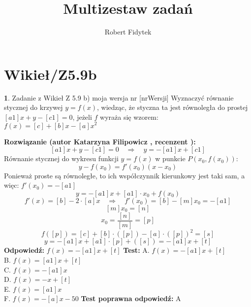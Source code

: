 \documentclass[12pt, a4paper]{article}
\title{Multizestaw zadań}
\author{Robert Fidytek}
\date{}
\theoremstyle{definition} %
\newtheorem{zad}{}
\newcommand{\kategoria}[1]{\section{#1}} %
\newcommand{\zadStart}[1]{\begin{zad}#1\newline} %
\newcommand{\zadStop}{\end{zad}}   %
\newcommand{\rozwStart}[2]{\noindent \textbf{Rozwiązanie (autor #1 , recenzent #2): }\newline} %
\newcommand{\rozwStop}{\newline}                                            %
\newcommand{\odpStart}{\noindent \textbf{Odpowiedź:}\newline}    %
\newcommand{\odpStop}{\newline}                                             %
\newcommand{\testStart}{\noindent \textbf{Test:}\newline} %
\newcommand{\testStop}{\newline} %
\newcommand{\kluczStart}{\noindent \textbf{Test poprawna odpowiedź:}\newline} %
\newcommand{\kluczStop}{\newline} %
\begin{document}
\maketitle


\kategoria{Wikieł/Z5.9b}
\zadStart{Zadanie z Wikieł Z 5.9 b) moja wersja nr [nrWersji]}
Wyznaczyć równanie stycznej do krzywej $y=f(x)$, wiedząc, że styczna ta jest równoległa do prostej $[a1]x+y-[c1]=0$, jeżeli $f$ wyraża się wzorem:\\
$f(x)=[c] +[b]x-[a]x^2$
\zadStop
\rozwStart{Katarzyna Filipowicz}{}
$$
[a1]x+y-[c1]=0 \quad \Rightarrow \quad y=-[a1]x+[c1]
$$
Równanie stycznej do wykresu funkcji $y=f(x)$ w punkcie $P(x_0,f(x_0))$:
$$
y-f(x_0)=f'(x_0)(x-x_0)
$$
Ponieważ proste są równoległe, to ich współczynnik kierunkowy jest taki sam, a więc: $f'(x_0)=-[a1]$
$$
y=-[a1]x+[a1]\cdot x_0+f(x_0)
$$ $$
f'(x)=[b]-2\cdot [a]x \quad \Rightarrow \quad f'(x_0)=[b]-[m]x_0=-[a1]
$$ $$
[m]x_0=[n]
$$ $$
x_0=\frac{[n]}{[m]}=[p]
$$ $$
f([p])=[c]+[b]\cdot([p])-[a]\cdot([p])^2=[s]
$$ $$
y=-[a1]x+[a1]\cdot[p]+([s])=-[a1]x +[t]
$$
\rozwStop
\odpStart
$f(x)=-[a1]x+ [t]$
\odpStop
\testStart
A. $f(x)=-[a1]x+ [t]$\\
B. $f(x)=[a1]x+ [t]$\\
C. $f(x)=-[a1]x$\\
D. $f(x)=-x+ [t]$\\
E. $f(x)=[a1]x$\\
F. $f(x)=-[a]x-50$
\testStop
\kluczStart
A
\kluczStop
\end{document}
